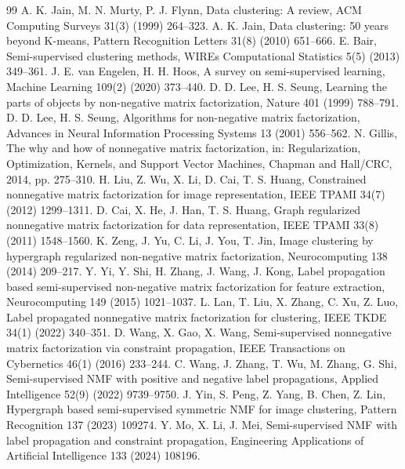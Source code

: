 \documentclass[times, review, 10pt]{elsarticle}
\begin{document}
\begin{thebibliography}{99}
 A. K. Jain, M. N. Murty, P. J. Flynn, Data clustering: A review, ACM Computing Surveys 31(3) (1999) 264--323.
 A. K. Jain, Data clustering: 50 years beyond K-means, Pattern Recognition Letters 31(8) (2010) 651--666.
 E. Bair, Semi-supervised clustering methods, WIREs Computational Statistics 5(5) (2013) 349--361.
 J. E. van Engelen, H. H. Hoos, A survey on semi-supervised learning, Machine Learning 109(2) (2020) 373--440.
 D. D. Lee, H. S. Seung, Learning the parts of objects by non-negative matrix factorization, Nature 401 (1999) 788--791.
 D. D. Lee, H. S. Seung, Algorithms for non-negative matrix factorization, Advances in Neural Information Processing Systems 13 (2001) 556--562.
 N. Gillis, The why and how of nonnegative matrix factorization, in: Regularization, Optimization, Kernels, and Support Vector Machines, Chapman and Hall/CRC, 2014, pp. 275--310.
 H. Liu, Z. Wu, X. Li, D. Cai, T. S. Huang, Constrained nonnegative matrix factorization for image representation, IEEE TPAMI 34(7) (2012) 1299--1311.
 D. Cai, X. He, J. Han, T. S. Huang, Graph regularized nonnegative matrix factorization for data representation, IEEE TPAMI 33(8) (2011) 1548--1560.
 K. Zeng, J. Yu, C. Li, J. You, T. Jin, Image clustering by hypergraph regularized non-negative matrix factorization, Neurocomputing 138 (2014) 209--217.
 Y. Yi, Y. Shi, H. Zhang, J. Wang, J. Kong, Label propagation based semi-supervised non-negative matrix factorization for feature extraction, Neurocomputing 149 (2015) 1021--1037.
 L. Lan, T. Liu, X. Zhang, C. Xu, Z. Luo, Label propagated nonnegative matrix factorization for clustering, IEEE TKDE 34(1) (2022) 340--351.
 D. Wang, X. Gao, X. Wang, Semi-supervised nonnegative matrix factorization via constraint propagation, IEEE Transactions on Cybernetics 46(1) (2016) 233--244.
 C. Wang, J. Zhang, T. Wu, M. Zhang, G. Shi, Semi-supervised NMF with positive and negative label propagations, Applied Intelligence 52(9) (2022) 9739--9750.
 J. Yin, S. Peng, Z. Yang, B. Chen, Z. Lin, Hypergraph based semi-supervised symmetric NMF for image clustering, Pattern Recognition 137 (2023) 109274.
 Y. Mo, X. Li, J. Mei, Semi-supervised NMF with label propagation and constraint propagation, Engineering Applications of Artificial Intelligence 133 (2024) 108196.

\end{thebibliography}
\end{document}
